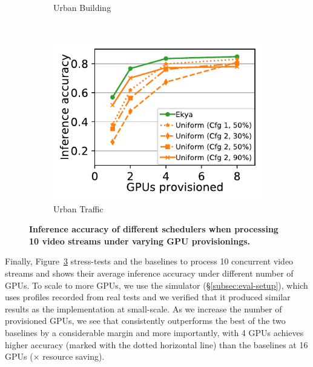 \begin{figure}
\begin{subfigure}[t]{0.47\linewidth}
    \caption{\small Urban Building}
    \label{fig:scalability-gpus-lasvegas-golden}
  \end{subfigure}
  ~~~
  \begin{subfigure}[t]{0.47\linewidth}
    \centering
    \includegraphics[width=\linewidth]{ekya/results/multicam/bellevue_10cam_scheduler_comparison_across_resources.pdf} 
    \caption{\small Urban Traffic}
    \label{fig:scalability-gpus-bellevue-golden}
  \end{subfigure}
  \caption{\small \bf Inference accuracy of different schedulers when processing 10 video streams under varying GPU provisionings.
  \vspace{-1em}
  }
  \label{fig:scalability-gpus}
\end{figure}


Finally, Figure~\ref{fig:scalability-gpus} stress-tests \name and the \fair baselines to process 10 concurrent video streams and shows their average inference accuracy under different number of GPUs. 
To scale to more GPUs, we use the simulator (\S\ref{subsec:eval-setup}), which uses profiles recorded from real tests and we verified that it produced similar results as the implementation at small-scale.
As we increase the number of provisioned GPUs, we see that \name consistently outperforms the best of the two baselines by a considerable margin and more importantly, with 4 GPUs \name achieves higher accuracy (marked with the dotted horizontal line) than the baselines at 16 GPUs ($\times$ resource saving).


